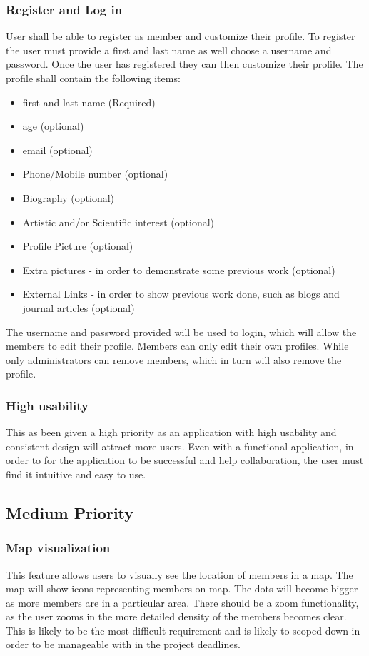 \documentclass[a4paper,oneside,11pt]{report}
\begin{document}
\subsubsection{Register and Log in} 
 User shall be able to register as member and customize their profile. To register the user must provide a first and last name as well choose a username and password. Once the user has registered they can then customize their profile. The profile shall contain the following items:
 \begin{itemize}
 \item first and last name (Required)
 \item age (optional)
 \item email (optional)
 \item Phone/Mobile number (optional)
 \item Biography (optional)
 \item Artistic and/or Scientific interest (optional)
 \item Profile Picture (optional)
 \item Extra pictures - in order to demonstrate some previous work (optional)
 \item External Links - in order to show previous work done, such as blogs and journal articles (optional)
 \end{itemize}
 The username and password provided will be used to login, which will allow the members to edit their profile.
 	Members can only edit their own profiles. While only administrators can remove members, which in turn will also remove the profile.

\subsubsection{High usability} 
This as been given a high priority as an application with high usability and consistent design will attract more users. Even with a functional application, in order to for the application to be successful and help collaboration, the user must find it intuitive and easy to use.
\subsection{Medium Priority}
\subsubsection{Map visualization}
This feature allows users to visually see the location of members in a map. The map will show icons representing members on map. The dots will become bigger as more members are in a particular area. There should be a zoom functionality, as the user zooms in the more detailed density of the members becomes clear. This is likely to be the most difficult requirement and is likely to scoped down in order to be manageable with in the project deadlines.
\end{document}

